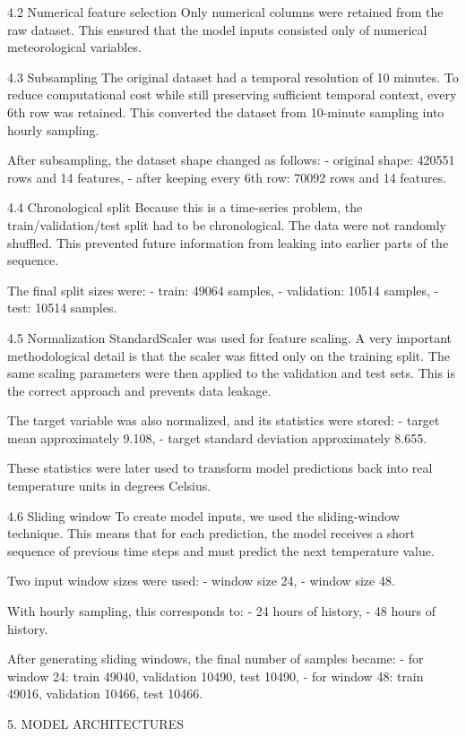 4.2 Numerical feature selection
Only numerical columns were retained from the raw dataset. This ensured that the model inputs consisted only of numerical meteorological variables.

4.3 Subsampling
The original dataset had a temporal resolution of 10 minutes. To reduce computational cost while still preserving sufficient temporal context, every 6th row was retained. This converted the dataset from 10-minute sampling into hourly sampling.

After subsampling, the dataset shape changed as follows:
- original shape: 420551 rows and 14 features,
- after keeping every 6th row: 70092 rows and 14 features.

4.4 Chronological split
Because this is a time-series problem, the train/validation/test split had to be chronological. The data were not randomly shuffled. This prevented future information from leaking into earlier parts of the sequence.

The final split sizes were:
- train: 49064 samples,
- validation: 10514 samples,
- test: 10514 samples.

4.5 Normalization
StandardScaler was used for feature scaling. A very important methodological detail is that the scaler was fitted only on the training split. The same scaling parameters were then applied to the validation and test sets. This is the correct approach and prevents data leakage.

The target variable was also normalized, and its statistics were stored:
- target mean approximately 9.108,
- target standard deviation approximately 8.655.

These statistics were later used to transform model predictions back into real temperature units in degrees Celsius.

4.6 Sliding window
To create model inputs, we used the sliding-window technique. This means that for each prediction, the model receives a short sequence of previous time steps and must predict the next temperature value.

Two input window sizes were used:
- window size 24,
- window size 48.

With hourly sampling, this corresponds to:
- 24 hours of history,
- 48 hours of history.

After generating sliding windows, the final number of samples became:
- for window 24: train 49040, validation 10490, test 10490,
- for window 48: train 49016, validation 10466, test 10466.

5. MODEL ARCHITECTURES

